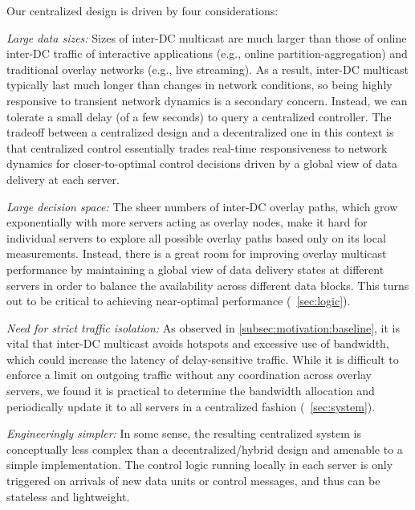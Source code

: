 Our centralized design is driven by four
considerations:
\begin{packedenumerate}
\item {\em Large data sizes:}
Sizes of inter-DC multicast are much larger
than those of online inter-DC traffic of interactive applications 
(e.g., online partition-aggregation) and 
traditional overlay networks (e.g., live streaming).
As a result, inter-DC multicast typically 
last much longer than changes in 
network conditions, so being highly responsive 
to transient network dynamics is a secondary concern.
Instead, we can tolerate a small delay (of a few seconds) 
to query a centralized controller. 
The tradeoff between a centralized design and a decentralized one
in this context is that centralized control essentially trades 
real-time responsiveness to network dynamics for 
closer-to-optimal control decisions driven by
a global view of data delivery at each server.
\item {\em Large decision space:}
The sheer numbers of inter-DC overlay paths,
which grow exponentially with more servers acting as overlay nodes,
make it hard for individual servers to explore all possible overlay
paths based only on its local measurements.
Instead, there is a great room for improving overlay multicast 
performance by maintaining a global view of data delivery states at 
different servers in order to balance the availability across 
different data blocks.
This turns out to be critical to achieving near-optimal performance
(\Section~\ref{sec:logic}).
\item {\em Need for strict traffic isolation:}
As observed in \Section\ref{subsec:motivation:baseline}, it is vital that inter-DC
multicast avoids hotspots and excessive use of
bandwidth, which could increase the latency of delay-sensitive traffic.
While it is difficult to enforce a limit on outgoing traffic
without any coordination across overlay servers, we found it is practical
to determine the bandwidth allocation and periodically update it
to all servers in a centralized fashion (\Section~\ref{sec:system}).
\item {\em Engineeringly simpler:}
In some sense, the resulting centralized system is conceptually
less complex than a decentralized/hybrid design 
and amenable to a simple implementation.
The control logic running locally in each server
is only triggered on arrivals of new data units or control messages,
and thus can be stateless and lightweight.

\end{packedenumerate}

